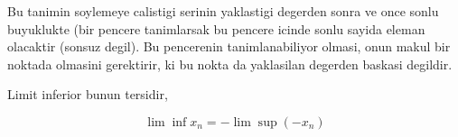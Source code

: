 \documentclass[12pt,fleqn]{article}
\begin{document}
Bu tanimin soylemeye calistigi serinin yaklastigi degerden sonra ve once
sonlu buyuklukte (bir pencere tanimlarsak bu pencere icinde sonlu sayida
eleman olacaktir (sonsuz degil). Bu pencerenin tanimlanabiliyor olmasi,
onun makul bir noktada olmasini gerektirir, ki bu nokta da yaklasilan
degerden baskasi degildir. 

Limit inferior bunun tersidir, 

\[ \lim \inf x_n  = -\lim \sup(-x_n)\]
\end{document}
